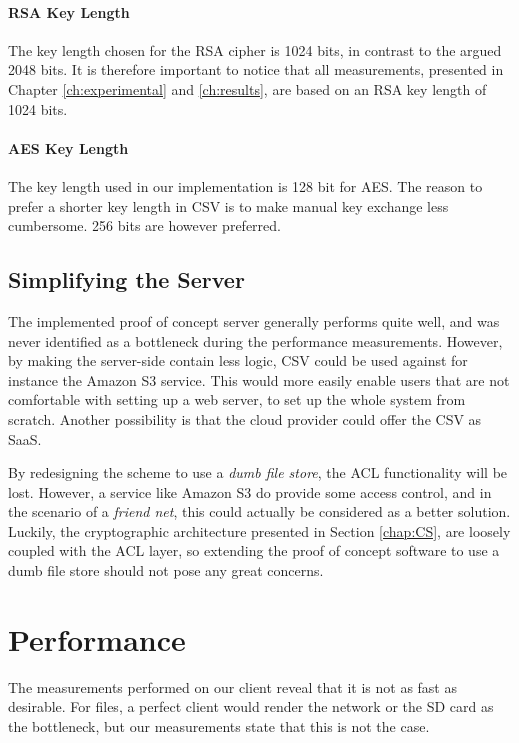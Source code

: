\documentclass[pdftex,english,10pt,b5paper,twoside]{book}
\begin{document}
\paragraph{RSA Key Length} The key length chosen for the RSA cipher is 1024
bits, in contrast to the argued 2048 bits. It is therefore important to notice
that all measurements, presented in Chapter \ref{ch:experimental} and
\ref{ch:results}, are based on an RSA key length of 1024 bits.

\paragraph{AES Key Length} The key length used in our implementation is 128 bit
for \ac{AES}. The reason to prefer a shorter key length in \ac{CSV} is to make
manual key exchange less cumbersome. 256 bits are however preferred.

\subsection{Simplifying the Server}

The implemented proof of concept server generally performs quite well, and was
never identified as a bottleneck during the performance measurements. However,
by making the server-side contain less logic, \ac{CSV} could be used against
for instance the Amazon S3 service. This would more easily enable users that
are not comfortable with setting up a web server, to set up the whole system
from scratch. Another possibility is that the cloud provider could offer the
\ac{CSV} as \ac{SaaS}.

By redesigning the scheme to use a \emph{dumb file store}, the \ac{ACL}
functionality will be lost. However, a service like Amazon S3 do provide some
access control, and in the scenario of a \emph{friend net}, this could actually
be considered as a better solution. Luckily, the cryptographic architecture
presented in Section \ref{chap:CS}, are loosely coupled with the \ac{ACL}
layer, so extending the proof of concept software to use a dumb file store
should not pose any great concerns.

\section{Performance}

The measurements performed on our client reveal that it is not as fast as
desirable. For files, a perfect client would render the network or the SD card
as the bottleneck, but our measurements state that this is not the case. 
\end{document}
